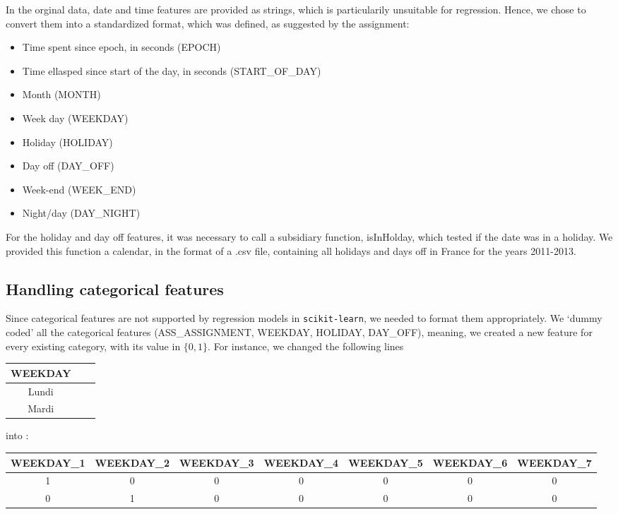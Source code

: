 \documentclass[a4paper,10pt]{article}
\begin{document}
    In the orginal data, date and time features are provided as strings, which is particularily unsuitable for regression. Hence, we chose to convert them into a standardized format, which was defined, as suggested by the assignment:
      \begin{itemize}
        \item Time spent since epoch, in seconds (EPOCH)
        \item Time ellasped since start of the day, in seconds (START\_OF\_DAY)
        \item Month (MONTH)
        \item Week day (WEEKDAY)
        \item Holiday (HOLIDAY)
        \item Day off (DAY\_OFF)
        \item Week-end (WEEK\_END)
        \item Night/day (DAY\_NIGHT)
      \end{itemize}

    For the holiday and day off features, it was necessary to call a subsidiary function, isInHolday, which tested if the date was in a holiday. We provided this function a calendar, in the format of a .csv file, containing all holidays and days off in France for the years 2011-2013.

    \subsection{Handling categorical features}

    Since categorical features are not supported by regression models in {\tt scikit-learn}, we needed to format them appropriately. We ‘dummy coded’ all the categorical features (ASS\_ASSIGNMENT, WEEKDAY, HOLIDAY, DAY\_OFF), meaning, we created a new feature for every existing category, with its value in $\{0,1\}$. For instance, we changed the following lines
    \begin{center}
    {\footnotesize
      \begin{tabular}{|c|c|c|}
        \hline
        WEEKDAY \\
        \hline
        Lundi \\
        \hline
        Mardi \\
        \hline
      \end{tabular}}
    \end{center}
    into :
    \begin{center}
      {\footnotesize
        \begin{tabular}{|c|c|c|c|c|c|c|}
          \hline
          WEEKDAY\_1 & WEEKDAY\_2 & WEEKDAY\_3 & WEEKDAY\_4 & WEEKDAY\_5 & WEEKDAY\_6 & WEEKDAY\_7 \\
          \hline
          1 & 0 & 0 & 0 & 0 & 0 & 0 \\
          \hline
          0 & 1 & 0 & 0 & 0 & 0 & 0 \\
          \hline
        \end{tabular}
      }
    \end{center}
\end{document}
